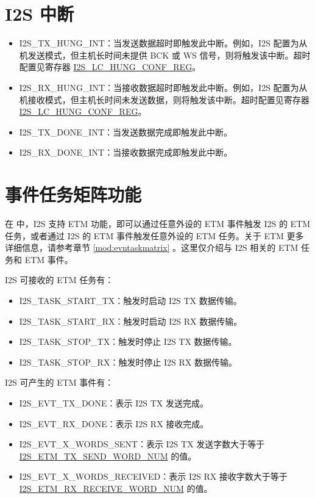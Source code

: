 \documentclass[main\_\_CN.tex]{subfiles}
\begin{document}
\section{I2S 中断} \label{sec:i2s-interrupts}

\begin{itemize}
\item \label{int:I2STXHUNGINT}I2S\_TX\_HUNG\_INT：当发送数据超时即触发此中断。例如，I2S 配置为从机发送模式，但主机长时间未提供 BCK 或 WS 信号，则将触发该中断。超时配置见寄存器 \hyperref[regdesc:I2SLCHUNGCONFREG]{I2S\_LC\_HUNG\_CONF\_REG}。
\item \label{int:I2SRXHUNGINT}I2S\_RX\_HUNG\_INT：当接收数据超时即触发此中断。例如，I2S 配置为从机接收模式，但主机长时间未发送数据，则将触发该中断。超时配置见寄存器 \hyperref[regdesc:I2SLCHUNGCONFREG]{I2S\_LC\_HUNG\_CONF\_REG}。
\item \label{int:I2STXDONEINT}I2S\_TX\_DONE\_INT：当发送数据完成即触发此中断。
\item \label{int:I2SRXDONEINT}I2S\_RX\_DONE\_INT：当接收数据完成即触发此中断。
\end{itemize}

\section{事件任务矩阵功能} \label{sec:i2s-etm-func}

在 \chipname{} 中，I2S 支持 ETM 功能，即可以通过任意外设的 ETM 事件触发 I2S 的 ETM 任务，或者通过 I2S 的 ETM 事件触发任意外设的 ETM 任务。关于 ETM 更多详细信息，请参考章节 \ref{mod:evntaskmatrix} 。这里仅介绍与 I2S 相关的 ETM 任务和 ETM 事件。

I2S 可接收的 ETM 任务有：

\begin{itemize}
    \item \label{task:I2STASKSTARTTX}I2S\_TASK\_START\_TX：触发时启动 I2S TX 数据传输。
    \item \label{task:I2STASKSTARTRX}I2S\_TASK\_START\_RX：触发时启动 I2S RX 数据传输。
    \item \label{task:I2STASKSTOPTX}I2S\_TASK\_STOP\_TX：触发时停止 I2S TX 数据传输。
    \item \label{task:I2STASKSTOPRX}I2S\_TASK\_STOP\_RX：触发时停止 I2S RX 数据传输。
\end{itemize}

I2S 可产生的 ETM 事件有：

\begin{itemize}
    \item \label{evt:I2SEVTTXDONE}I2S\_EVT\_TX\_DONE：表示 I2S TX 发送完成。
    \item \label{evt:I2SEVTRXDONE}I2S\_EVT\_RX\_DONE：表示 I2S RX 接收完成。
    \item \label{evt:I2SEVTXWORDSSENT}I2S\_EVT\_X\_WORDS\_SENT：表示 I2S TX 发送字数大于等于 \hyperref[fielddesc:I2SETMTXSENDWORDNUM]{I2S\_ETM\_TX\_SEND\_WORD\_NUM} 的值。
    \item \label{evt:I2SEVTXWORDSRECEIVED}I2S\_EVT\_X\_WORDS\_RECEIVED：表示 I2S RX 接收字数大于等于 \hyperref[fielddesc:I2SETMRXRECEIVEWORDNUM]{I2S\_ETM\_RX\_RECEIVE\_WORD\_NUM} 的值。
\end{itemize}
\end{document}
